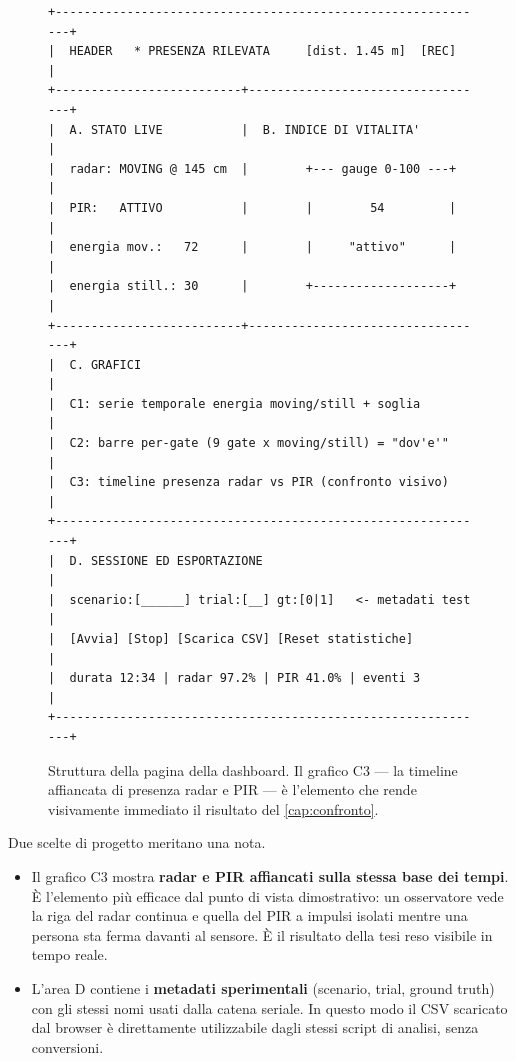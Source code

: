 \begin{figure}[htbp]
\centering
\begin{minipage}{0.95\linewidth}
\ttfamily\scriptsize
\begin{verbatim}
+-------------------------------------------------------------+
|  HEADER   * PRESENZA RILEVATA     [dist. 1.45 m]  [REC]     |
+--------------------------+----------------------------------+
|  A. STATO LIVE           |  B. INDICE DI VITALITA'          |
|  radar: MOVING @ 145 cm  |        +--- gauge 0-100 ---+     |
|  PIR:   ATTIVO           |        |        54         |     |
|  energia mov.:   72      |        |     "attivo"      |     |
|  energia still.: 30      |        +-------------------+     |
+--------------------------+----------------------------------+
|  C. GRAFICI                                                 |
|  C1: serie temporale energia moving/still + soglia           |
|  C2: barre per-gate (9 gate x moving/still) = "dov'e'"       |
|  C3: timeline presenza radar vs PIR (confronto visivo)       |
+-------------------------------------------------------------+
|  D. SESSIONE ED ESPORTAZIONE                                 |
|  scenario:[______] trial:[__] gt:[0|1]   <- metadati test    |
|  [Avvia] [Stop] [Scarica CSV] [Reset statistiche]            |
|  durata 12:34 | radar 97.2% | PIR 41.0% | eventi 3           |
+-------------------------------------------------------------+
\end{verbatim}
\end{minipage}
\caption{Struttura della pagina della dashboard. Il grafico C3 --- la timeline
affiancata di presenza radar e PIR --- è l'elemento che rende visivamente immediato
il risultato del \cref{cap:confronto}.}
\label{fig:webui-layout}
\end{figure}

Due scelte di progetto meritano una nota.

\begin{itemize}[leftmargin=1.4em,itemsep=3pt]
  \item Il grafico C3 mostra \textbf{radar e PIR affiancati sulla stessa base dei
        tempi}. È l'elemento più efficace dal punto di vista dimostrativo: un
        osservatore vede la riga del radar continua e quella del PIR a impulsi
        isolati mentre una persona sta ferma davanti al sensore. È il risultato
        della tesi reso visibile in tempo reale.
  \item L'area D contiene i \textbf{metadati sperimentali} (scenario, trial, ground
        truth) con gli stessi nomi usati dalla catena seriale. In questo modo il CSV
        scaricato dal browser è direttamente utilizzabile dagli stessi script di
        analisi, senza conversioni.
\end{itemize}

